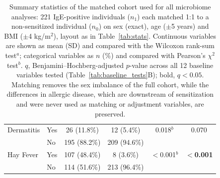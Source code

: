 \begin{table}[h!]
\begin{tabular}{llcccc}
Dermatitis & Yes & 26 (11.8\%) & 12 (5.4\%) & 0.018$^{b}$ & 0.070 \\
 & No & 195 (88.2\%) & 209 (94.6\%) &  &  \\

Hay Fever & Yes & 107 (48.4\%) & 8 (3.6\%) & $<$0.001$^{b}$ & \textbf{$<$0.001} \\
 & No & 114 (51.6\%) & 213 (96.4\%) &  &  \\

\end{tabular}
\caption{Summary statistics of the matched cohort used for all microbiome analyses: 221 IgE-positive individuals ($n_1$) each matched 1:1 to a non-sensitized individual ($n_0$) on sex (exact), age ($\pm$5 years) and BMI ($\pm$4 kg/m$^2$), layout as in Table~\ref{tab:stats}. Continuous variables are shown as mean (SD) and compared with the Wilcoxon rank-sum test$^{a}$; categorical variables as $n$ (\%) and compared with Pearson's $\chi^2$ test$^{b}$. $q$, Benjamini--Hochberg-adjusted $p$-value across all 12 baseline variables tested (Table~\ref{tab:baseline_tests}B); bold, $q < 0.05$. Matching removes the sex imbalance of the full cohort, while the differences in allergic disease, which are downstream of sensitization and were never used as matching or adjustment variables, are preserved.\label{tab:matched_cohort}}
\end{table}
